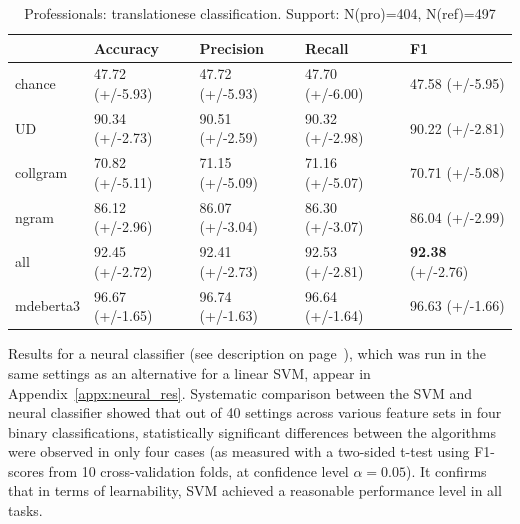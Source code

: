 \begin{table}[H]
	\centering
	\begin{tabular}{p{2.9cm}|llll}
		\toprule
		& Accuracy        & Precision       & Recall        & F1              \\
		\midrule
		chance          & 47.72 (+/-5.93) & 47.72 (+/-5.93) & 47.70 (+/-6.00) & 47.58 (+/-5.95) \\
		\midrule
		UD              & 90.34 (+/-2.73) & 90.51 (+/-2.59) & 90.32 (+/-2.98) & 90.22 (+/-2.81) \\
		collgram        & 70.82 (+/-5.11) & 71.15 (+/-5.09) & 71.16 (+/-5.07) & 70.71 (+/-5.08) \\
		ngram           & 86.12 (+/-2.96) & 86.07 (+/-3.04) & 86.30 (+/-3.07) & 86.04 (+/-2.99) \\
		all             & 92.45 (+/-2.72) & 92.41 (+/-2.73) & 92.53 (+/-2.81) & \textbf{92.38} (+/-2.76) \\
		\midrule
		mdeberta3  & 96.67 (+/-1.65) & 96.74 (+/-1.63) & 96.64 (+/-1.64) & \boxit{0.4in} 96.63 (+/-1.66)\\		
		\bottomrule
	\end{tabular}
	\caption{\label{tab:pro-ref}Professionals: translationese classification. Support: N(pro)=404, N(ref)=497}
\end{table}

Results for a neural classifier (see description on page~\pageref{pg:neural}), which was run in the same settings as an alternative for a linear SVM, appear in Appendix~\ref{appx:neural_res}. Systematic comparison between the SVM and neural classifier showed that out of 40 settings across various feature sets in four binary classifications, statistically significant differences between the algorithms were observed in only four cases (as measured with a two-sided t-test using F1-scores from 10 cross-validation folds, at confidence level $\alpha=0.05$). It confirms that in terms of learnability, SVM achieved a reasonable performance level in all tasks. 

